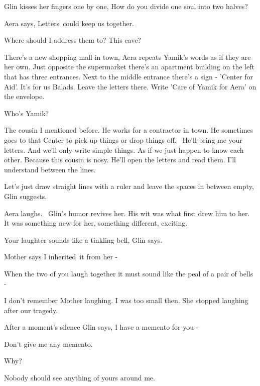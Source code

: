 \documentclass[letterpaper]{article}
\begin{document}
Glin kisses her fingers one by one, {\textquotedbl}How do you divide one soul into two halves?{\textquotedbl}

Aera says, {\textquotedbl}Letters~could keep us together.{\textquotedbl} 

{\textquotedbl}Where should I address them to? This cave?{\textquotedbl} 

{\textquotedbl}There's a new shopping mall in town,{\textquotedbl} Aera repeats Yamik's words as if they are her own.
{\textquotedbl}Just opposite the supermarket there's an apartment building on the left that has three entrances. Next
to the middle entrance there's a sign - 'Center for Aid'. It's for us Balads. Leave the letters there. Write 'Care of
Yamik for Aera' on the envelope.{\textquotedbl} 

{\textquotedbl}Who's Yamik?{\textquotedbl} 

{\textquotedbl}The cousin I mentioned before. He works for a contractor in town. He sometimes goes to that Center to
pick up things or drop things off.~ He'll bring me your letters. And we'll only write simple things. As if we just
happen to know each other. Because this cousin is nosy. He'll open the letters and read them. I'll understand between
the lines.{\textquotedbl}

{\textquotedbl}Let's just draw straight lines with a ruler and leave the spaces in between empty,{\textquotedbl} Glin
suggests. 

Aera laughs. ~Glin's humor revives her. His wit was what first drew him to her. It was something new for her, something
different, exciting.

{\textquotedbl}Your laughter sounds like a tinkling bell,{\textquotedbl} Glin says.

{\textquotedbl}Mother says I inherited\ it from her -{\textquotedbl} 

{\textquotedbl}When the two of you laugh together it must sound like the peal of a pair of bells -{\textquotedbl} 

{\textquotedbl}I don't remember Mother laughing. I was too small then. She stopped laughing after our
tragedy.{\textquotedbl}

After a moment's silence Glin says, {\textquotedbl}I have a memento for you -{\textquotedbl} 

{\textquotedbl}Don't give me any memento.{\textquotedbl} 

{\textquotedbl}Why?{\textquotedbl} 

{\textquotedbl}Nobody should see anything of yours around me.{\textquotedbl} 
\end{document}
